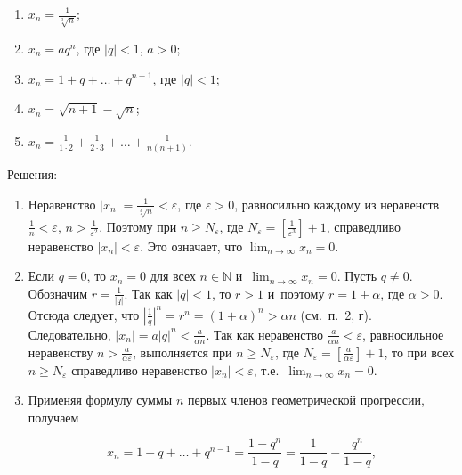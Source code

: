 \begin{enumerate}
\item\label{ex:3_1_1_1} $\displaystyle x_{n} = \frac{1}{\sqrt[3]{n}}$;
\item\label{ex:3_1_1_2} $x_{n} = aq^{n}$, где $|q| <1$, $a > 0$;
\item\label{ex:3_1_1_3} $x_{n} = 1 + q + \dots + q^{n-1}$, где $|q| < 1$;
\item\label{ex:3_1_1_4} $x_{n} = \sqrt{n+1} - \sqrt{n}$;
\item\label{ex:3_1_1_5} 
$\displaystyle x_{n} = \frac{1}{1 \cdot 2} + \frac{1}{2 \cdot 3} + \dots + \frac{1}{n(n+1)}$.
\end{enumerate}

Решения:
\begin{enumerate}

\item Неравенство $\displaystyle |x_{n}| = \frac{1}{\sqrt[3]{n}} < \varepsilon$,
где $\varepsilon > 0$, равносильно каждому из неравенств
$\displaystyle \frac{1}{n} < \varepsilon$, $\displaystyle n > \frac{1}{\varepsilon^{2}}$.
Поэтому при $n \geqslant N_{\varepsilon}$,
где $\displaystyle N_{\varepsilon} = \left[ \frac{1}{\varepsilon^{3}} \right] + 1$,
справедливо неравенство $|x_{n}| < \varepsilon$.
Это означает, что $\displaystyle \lim_{n \to \infty} x_{n} = 0$.

\item Если $q = 0$, то $x_{n} = 0$ для всех
$n \in \mathbb{N}$ и~$\displaystyle \lim_{n \to \infty} x_{n} = 0$. Пусть $q \ne 0$.
Обозначим $\displaystyle r = \frac{1}{|q|}$. Так как $|q| < 1$, то $r >1$
и~поэтому $r = 1 + \alpha$, где $\alpha > 0$. Отсюда следует, что
$\displaystyle \left| \frac{1}{q} \right|^{n} = r^{n} = (1 + \alpha)^{n} > \alpha n$
(см.\ п.\ 2, г). \\
Следовательно, $\displaystyle |x_{n}| = a|q|^{n} < \frac{a}{\alpha n}$.
Так как неравенство $\displaystyle \frac{a}{\alpha n} < \varepsilon$,
равносильное неравенству $\displaystyle n > \frac{a}{\alpha \varepsilon}$,
выполняется при $n \geqslant N_{\varepsilon}$,
где $\displaystyle N_{\varepsilon} = \left[ \frac{a}{\alpha \varepsilon} \right] + 1$,
то при всех $n \geqslant N_{\varepsilon}$ справедливо неравенство $|x_{n}| < \varepsilon$,
т.е.\ $\displaystyle \lim_{n \to \infty} x_{n} = 0$.

\item Применяя формулу суммы $n$ первых членов геометрической прогрессии, получаем

\begin{equation*}
\displaystyle x_{n} = 1 + q + \dots + q^{n-1} =
\frac{1 - q^{n}}{1 - q} =
\frac{1}{1 - q} - \frac{q^{n}}{1 - q},
\end{equation*}


\end{enumerate}
